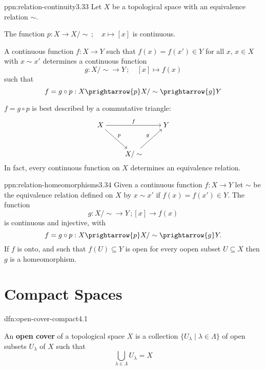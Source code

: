 \documentclass[landscape, 8pt]{extarticle}
\begin{document}
\begin{multicols}{3}
\newpage
\begin{ppn}{ppn:relation-continuity}{3.33}
Let $X$ be a topological space with an equivalence relation $\sim$.
\begin{enumerate-zero}
\item The function $p: X \to X / \sim \,; \quad x \mapsto [x] $ is continuous.
\item A continuous function $f : X \to Y$ such that $f(x) = f(x')\in Y$ for all $x,\,x\in X$ with $x \sim x'$ determines a continuous function
\[g : X / \sim \to Y\,;\quad [x] \mapsto f(x)\]
such that
\[f = g \circ p : X \prightarrow{p} X /\sim \prightarrow{g} Y\]
\end{enumerate-zero}
$f = g \circ p$ is best described by a commutative triangle:
\[\begin{tikzcd}[cramped, column sep=small, row sep=scriptsize]
		X &&&& Y \\
		\\
		&& {X /\sim}
		\arrow["f", from=1-1, to=1-5]
		\arrow["p", from=1-1, to=3-3]
		\arrow["g", from=3-3, to=1-5]
	\end{tikzcd}\]
In fact, every continuous function on $X$ determines an equivalence relation.
\end{ppn}

\begin{ppn}{ppn:relation-homeomorphisms}{3.34}
	Given a continuous function $f : X \to Y$ let $\sim$ be the equivalence relation defined on $X$ by $x \sim x'$ if $f(x) = f(x') \in Y$. The function
	\[g : X /\sim \to Y\,; [x] \to f(x)\]
	is continuous and injective, with
	\[f = g \circ p : X \prightarrow{p} X / \sim \prightarrow{g} Y.\]
	If $f$ is onto, and such that $f(U) \subseteq Y$ is open for every oopen subset $U \subseteq X$ then $g$ is a homeomorphism.
\end{ppn}

\section{Compact Spaces}

\begin{dfn}{dfn:open-cover-compact}{4.1}
    \begin{enumerate-tight}
        \item An \textbf{open cover} of a topological space $X$ is a collection $\{U_{\lambda} \mid \lambda\in \Lambda\}$ of open subsets $U_{\lambda}$ of $X$ such that
            \[\bigcup_{\lambda\in \Lambda} U_{\lambda} = X\]


\end{enumerate-tight}
\end{dfn}
\end{multicols}
\end{document}
